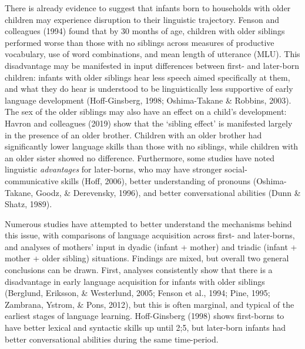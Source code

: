 \documentclass[
  english,
  man,floatsintext]{apa6}
\begin{document}
There is already evidence to suggest that infants born to households with older children may experience disruption to their linguistic trajectory. Fenson and colleagues (1994) found that by 30 months of age, children with older siblings performed worse than those with no siblings across measures of productive vocabulary, use of word combinations, and mean length of utterance (MLU). This disadvantage may be manifested in input differences between first- and later-born children: infants with older siblings hear less speech aimed specifically at them, and what they do hear is understood to be linguistically less supportive of early language development (Hoff-Ginsberg, 1998; Oshima-Takane \& Robbins, 2003). The sex of the older siblings may also have an effect on a child's development: Havron and colleagues (2019) show that the `sibling effect' is manifested largely in the presence of an older brother. Children with an older brother had significantly lower language skills than those with no siblings, while children with an older sister showed no difference. Furthermore, some studies have noted linguistic \emph{advantages} for later-borns, who may have stronger social-communicative skills (Hoff, 2006), better understanding of pronouns (Oshima-Takane, Goodz, \& Derevensky, 1996), and better conversational abilities (Dunn \& Shatz, 1989).

Numerous studies have attempted to better understand the mechanisms behind this issue, with comparisons of language acquisition across first- and later-borns, and analyses of mothers' input in dyadic (infant + mother) and triadic (infant + mother + older sibling) situations. Findings are mixed, but overall two general conclusions can be drawn. First, analyses consistently show that there is a disadvantage in early language acquisition for infants with older siblings (Berglund, Eriksson, \& Westerlund, 2005; Fenson et al., 1994; Pine, 1995; Zambrana, Ystrom, \& Pons, 2012), but this is often marginal, and typical of the earliest stages of language learning. Hoff-Ginsberg (1998) shows first-borns to have better lexical and syntactic skills up until 2;5, but later-born infants had better conversational abilities during the same time-period.
\end{document}
